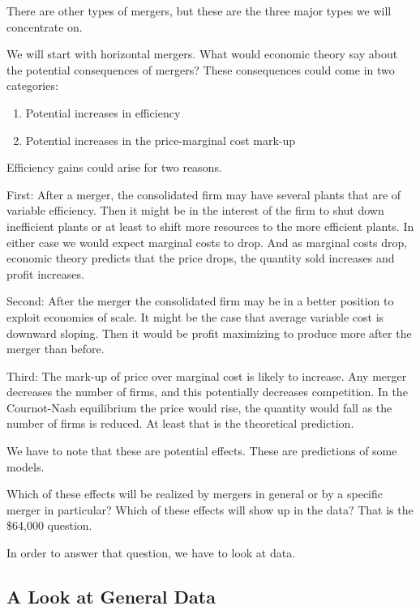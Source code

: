 \documentclass[
]{book}
\providecommand{\tightlist}{%
  \setlength{\itemsep}{0pt}\setlength{\parskip}{0pt}}
\begin{document}
There are other types of mergers, but these are the three major types we will concentrate on.

We will start with horizontal mergers. What would economic theory say about the potential consequences of mergers? These consequences could come in two categories:

\begin{enumerate}
\def\labelenumi{\arabic{enumi}.}
\tightlist
\item
  Potential increases in efficiency
\item
  Potential increases in the price-marginal cost mark-up
\end{enumerate}

Efficiency gains could arise for two reasons.

First: After a merger, the consolidated firm may have several plants that are of variable efficiency. Then it might be in the interest of the firm to shut down inefficient plants or at least to shift more resources to the more efficient plants. In either case we would expect marginal costs to drop. And as marginal costs drop, economic theory predicts that the price drops, the
quantity sold increases and profit increases.

Second: After the merger the consolidated firm may be in a better position to exploit economies of scale. It might be the case that average variable cost is downward sloping. Then it would be profit maximizing to produce more after the merger than before.

Third: The mark-up of price over marginal cost is likely to increase. Any merger decreases the number of firms, and this potentially decreases competition. In the Cournot-Nash equilibrium the price would rise, the quantity would fall as the number of firms is reduced. At least that is the theoretical prediction.

We have to note that these are potential effects. These are predictions of some models.

Which of these effects will be realized by mergers in general or by a specific merger in particular? Which of these effects will show up in the data? That is the \$64,000 question.

In order to answer that question, we have to look at data.

\hypertarget{a-look-at-general-data}{%
\subsection{A Look at General Data}\label{a-look-at-general-data}}
\end{document}
